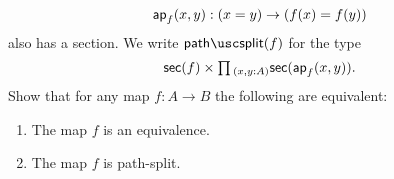 \begin{exercises}
\begin{equation*}
\mathsf{ap}_{f}(x,y):(x=y)\to (f(x)=f(y))
\end{equation*}
also has a section. We write $\pathsplit(f)$ for the type
\begin{equation*}
\sections(f)\times\prd{x,y:A}\sections(\apfunc{f}(x,y)).
\end{equation*}
Show that for any map $f:A\to B$ the following are equivalent:
\begin{enumerate}
\item The map $f$ is an equivalence.
\item The map $f$ is path-split.
\end{enumerate}
\begin{comment}
\exercise \label{ex:eqv_sigma_mv}Consider a map
\begin{equation*}
f:A \to \sm{y:B}C(y).
\end{equation*}
\begin{subexenum}
\item Construct a family of maps
\begin{equation*}
f':\prd{y:B} \fib{\proj 1\circ f}{y}\to C(y).
\end{equation*}
\item Construct an equivalence
\begin{equation*}
\eqv{\fib{f'(b)}{c}}{\fib{f}{(b,c)}}
\end{equation*}
for every $(b,c):\sm{y:B}C(y)$.
\item Conclude that the following are equivalent:
\begin{enumerate}
\item $f$ is an equivalence.
\item $f'$ is a family of equivalences.
\end{enumerate}
\end{subexenum}
\exercise \label{ex:coh_intro}Consider a type $A$ with base point $a:A$, and let $B$ be a type family on $A$ that implies the identity type, i.e., there is a term
\begin{equation*}
\alpha : \prd{x:A} B(x)\to (a=x).
\end{equation*}
Show that the \define{coherence reduction map}
\begin{equation*}
\cohreduction : \Big(\sm{y:B(a)}\alpha(a,y)=\refl{a}\Big) \to \Big(\sm{x:A}B(x)\Big)
\end{equation*}
defined by $\lam{(y,q)}(a,y)$ is an equivalence.
\end{comment}

\end{exercises}
